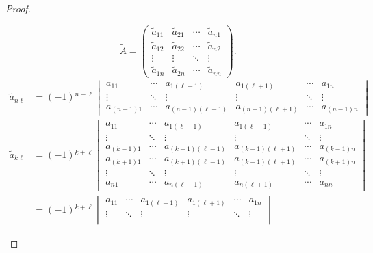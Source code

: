 \documentclass[class=linear-algebra,crop=false]{standalone}
\begin{document}
\begin{proof}
\begin{enumerate}[label = \textbf{Trường hợp \arabic*.},itemindent=2cm]
		      \[
			      \tilde{A} =
			      \begin{pmatrix}
				      \tilde{a}_{11} & \tilde{a}_{21} & \cdots & \tilde{a}_{n1} \\
				      \tilde{a}_{12} & \tilde{a}_{22} & \cdots & \tilde{a}_{n2} \\
				      \vdots         & \vdots         & \ddots & \vdots         \\
				      \tilde{a}_{1n} & \tilde{a}_{2n} & \cdots & \tilde{a}_{nn}
			      \end{pmatrix}.
		      \]
		      \begingroup{}
		      \allowdisplaybreaks{}
		      \begin{align*}
			      \tilde{a}_{n\ell} & = (-1){}^{n+\ell}
			      \begin{vmatrix}
				      a_{11}     & \cdots & a_{1(\ell-1)}     & a_{1(\ell+1)}     & \cdots & a_{1n}     \\
				      \vdots     & \ddots & \vdots            & \vdots            & \ddots & \vdots     \\
				      a_{(n-1)1} & \cdots & a_{(n-1)(\ell-1)} & a_{(n-1)(\ell+1)} & \cdots & a_{(n-1)n}
			      \end{vmatrix}                             \\
			      \tilde{a}_{k\ell} & = (-1){}^{k+\ell}
			      \begin{vmatrix}
				      a_{11}     & \cdots & a_{1(\ell-1)}     & a_{1(\ell+1)}     & \cdots & a_{1n}     \\
				      \vdots     & \ddots & \vdots            & \vdots            & \ddots & \vdots     \\
				      a_{(k-1)1} & \cdots & a_{(k-1)(\ell-1)} & a_{(k-1)(\ell+1)} & \cdots & a_{(k-1)n} \\
				      a_{(k+1)1} & \cdots & a_{(k+1)(\ell-1)} & a_{(k+1)(\ell+1)} & \cdots & a_{(k+1)n} \\
				      \vdots     & \ddots & \vdots            & \vdots            & \ddots & \vdots     \\
				      a_{n1}     & \cdots & a_{n(\ell-1)}     & a_{n(\ell+1)}     & \cdots & a_{nn}
			      \end{vmatrix}                             \\
			                        & = (-1){}^{k+\ell}
			      \begin{vmatrix}
				      a_{11}            & \cdots & a_{1(\ell-1)}            & a_{1(\ell+1)}            & \cdots & a_{1n}            \\
				      \vdots            & \ddots & \vdots                   & \vdots                   & \ddots & \vdots            \\

\end{vmatrix}
\end{align*}
\end{enumerate}
\end{proof}
\end{document}
